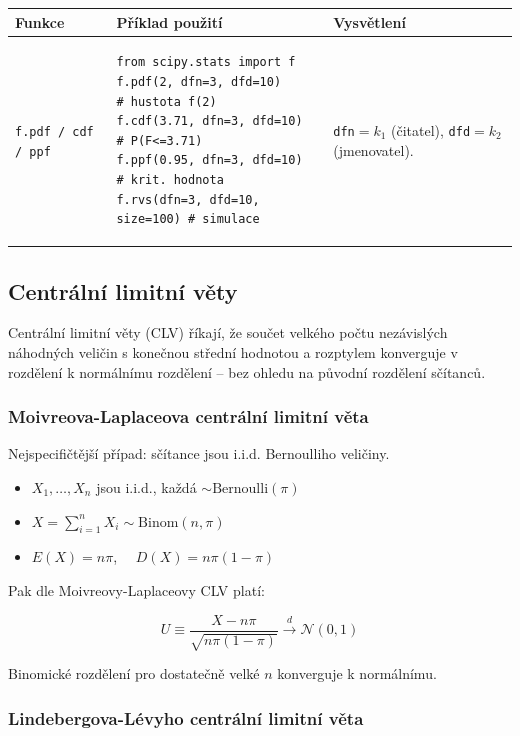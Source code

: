 \documentclass[a4paper, 11pt]{article}
\newenvironment{funkcedict}
{%
  \begingroup
  \renewcommand{\arraystretch}{1.4}%
  \lstset{basicstyle=\ttfamily\small, columns=fullflexible}%
  \setlength{\tabcolsep}{4pt}%
  \begin{tabular}{p{0.19\textwidth} p{0.38\textwidth} p{0.30\textwidth}}
  \textbf{Funkce} & \textbf{Příklad použití} & \textbf{Vysvětlení} \\
  \midrule
}
{%
  \end{tabular}%
  \endgroup
}
\begin{document}
\begin{funkcedict}
	\texttt{f.pdf / cdf / ppf} &
	\begin{lstlisting}
from scipy.stats import f
f.pdf(2, dfn=3, dfd=10)     # hustota f(2)
f.cdf(3.71, dfn=3, dfd=10)  # P(F<=3.71)
f.ppf(0.95, dfn=3, dfd=10)  # krit. hodnota
f.rvs(dfn=3, dfd=10, size=100) # simulace
	\end{lstlisting}
	& \texttt{dfn}$=k_1$ (čitatel), \texttt{dfd}$=k_2$ (jmenovatel). \\
\end{funkcedict}

\subsection{Centrální limitní věty}

Centrální limitní věty (CLV) říkají, že součet velkého počtu nezávislých
náhodných veličin s konečnou střední hodnotou a rozptylem konverguje
v rozdělení k normálnímu rozdělení -- bez ohledu na původní rozdělení sčítanců.

\subsubsection{Moivreova-Laplaceova centrální limitní věta}

Nejspecifičtější případ: sčítance jsou i.i.d. Bernoulliho veličiny.

\begin{itemize}[noitemsep]
    \item $X_1, \ldots, X_n$ jsou i.i.d., každá $\sim \mathrm{Bernoulli}(\pi)$
    \item $X = \sum_{i=1}^{n} X_i \sim \mathrm{Binom}(n, \pi)$
    \item $E(X) = n\pi$, $\quad D(X) = n\pi(1-\pi)$
\end{itemize}

Pak dle Moivreovy-Laplaceovy CLV platí:

\begin{equation*}
    U \equiv \frac{X - n\pi}{\sqrt{n\pi(1-\pi)}} \xrightarrow{d} \mathcal{N}(0,1)
\end{equation*}

Binomické rozdělení pro dostatečně velké $n$ konverguje k normálnímu.

\subsubsection{Lindebergova-Lévyho centrální limitní věta}
\end{document}
